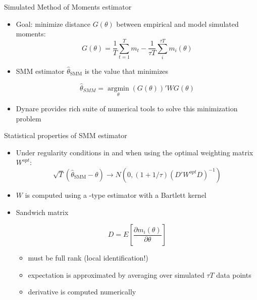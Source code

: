 \begin{frame}{Simulated Method of Moments estimator}
  \begin{itemize}
    \item Goal: minimize distance $G(\theta)$ between empirical and model simulated moments:
          \begin{equation}
            G(\theta) = \frac{1}{T} \sum_{t=1}^{T} m_t - \frac{1}{\tau T} \sum_{i}^{\tau T} m_i(\theta)
          \end{equation}

    \item SMM estimator $\hat{\theta}_{\text{SMM}}$ is the value that minimizes

          \begin{equation}
            {\hat \theta _{SMM}} = \mathop {\text{argmin}}\limits_\theta  \left( {G\left( \theta  \right)} \right)'WG\left( \theta  \right)
          \end{equation}

    \item Dynare provides rich suite of numerical tools to solve this minimization problem
  \end{itemize}
\end{frame}


\begin{frame}{Statistical properties of SMM estimator}
  \begin{itemize}
    \item Under regularity conditions in \textcite{DuffieSingleton1993} and when using the optimal weighting matrix $W^{opt}$:
          \begin{equation}
            \sqrt{T} (\hat{\theta}_{\text{SMM}} - \theta) \rightarrow N \left( 0, (1 + 1/\tau)(D'W^{opt}D)^{-1} \right)
          \end{equation}
    \item $ W $ is computed using a \textcite{NeweyWest1987}-type estimator with a Bartlett kernel
    \item Sandwich matrix

          \begin{equation}
            D = E \left[ \frac{\partial m_i(\theta)}{\partial \theta} \right]
          \end{equation}

          \begin{itemize}
            \item must be full rank (local identification!)
            \item expectation is approximated by averaging over simulated $ \tau T $ data points
            \item derivative is computed numerically
          \end{itemize}

  \end{itemize}
\end{frame}


